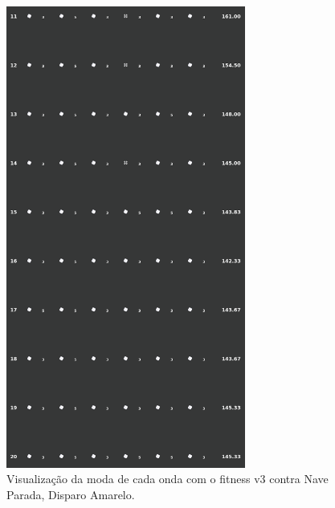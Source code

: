 \begin{figure}[H]
  \centering
  \includegraphics[width=0.7\textwidth]{figuras/ss/ss_yellowstill_ai_mode_2_2.png}
  \caption{Visualização da moda de cada onda com o fitness v3 contra Nave Parada, Disparo Amarelo.}
  \label{fig:ss-moda-ys-2-2}
\end{figure}


